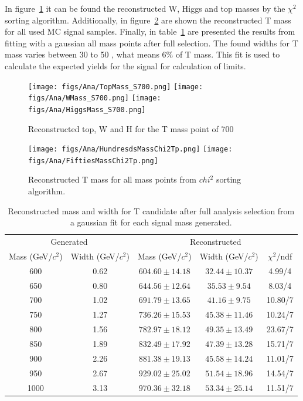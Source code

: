 In figure~\ref{fig:WHt} it can be found the reconstructed W, Higgs and top masses by the $\chi^{2}$ sorting algorithm. Additionally, in figure~\ref{fig:RecT} are shown the reconstructed T mass for all used MC signal samples. Finally, in table~\ref{tab:SignalWidths} are presented the results from fitting with a gaussian all mass points after full selection. The found widths for T mass varies between 30 to 50 \GeVcc, what means 6\% of T mass. This fit is used to calculate the expected yields for the signal for calculation of limits.

\begin{figure}[!Hhtbp]
  \begin{center}
    \texttt{[image: figs/Ana/TopMass\_S700.png]}
    \texttt{[image: figs/Ana/WMass\_S700.png]}
    \texttt{[image: figs/Ana/HiggsMass\_S700.png]}
    \caption{Reconstructed top, W and H for the T mass point of 700 \GeVcc}
    \label{fig:WHt}
  \end{center}
\end{figure}

\begin{figure}[!Hhtbp]
  \begin{center}
    \texttt{[image: figs/Ana/HundresdsMassChi2Tp.png]}
    \texttt{[image: figs/Ana/FiftiesMassChi2Tp.png]}
    \caption{Reconstructed T mass for all mass points from $chi^{2}$ sorting algorithm.}
    \label{fig:RecT}
  \end{center}
\end{figure}

\begin{table}[htbH]
\begin{center}
\begin{tabular}{|c|c|c|c|c|}
\hline 
\multicolumn{2}{|c}{Generated} & \multicolumn{3}{|c|}{Reconstructed} \\
Mass (GeV/$c^{2}$) & Width (GeV/$c^{2}$) & Mass (GeV/$c^{2}$) & Width (GeV/$c^{2}$) & $\chi^{2} /$ndf\\
\hline
600 & 0.62 &$604.60\pm14.18$ & $32.44\pm10.37$ & 4.99/4\\
650 & 0.80 &$644.56\pm12.64$ & $35.53\pm9.54$ & 8.03/4\\
700 & 1.02 &$691.79\pm13.65$ & $41.16\pm9.75$ & 10.80/7\\
750 & 1.27 &$736.26\pm15.53$ & $45.38\pm11.46$ & 10.24/7\\
800 & 1.56 &$782.97\pm18.12$ & $49.35\pm13.49$ & 23.67/7\\
850 & 1.89 &$832.49\pm17.92$ & $47.39\pm13.28$ & 15.71/7\\
900 & 2.26 &$881.38\pm19.13$ & $45.58\pm14.24$ & 11.01/7\\
950 & 2.67 &$929.02\pm25.02$ & $51.54\pm18.96$ & 14.54/7\\
1000 & 3.13 &$970.36\pm32.18$ & $53.34\pm25.14$ & 11.51/7\\
\hline
\end{tabular}
\caption{Reconstructed mass and width for T candidate after full analysis selection from a gaussian fit for each signal mass generated. \label{tab:SignalWidths}}
\end{center}
\end{table}

